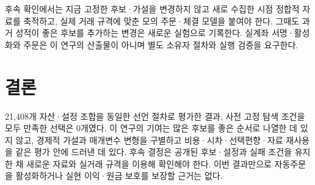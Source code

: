 \documentclass[11pt,a4paper]{article}
\begin{document}
후속 확인에서는 지금 고정한 후보·가설을 변경하지 않고 새로 수집한 시점 정합적 자료를 축적하고, 실제 거래 규격에 맞춘 모의 주문·체결 모델을 붙여야 한다. 그때도 과거 성적이 좋은 후보를 추가하는 변경은 새로운 실험으로 기록한다. 실계좌 서명·활성화와 주문은 이 연구의 산출물이 아니며 별도 소유자 절차와 실행 검증을 요구한다.

\section{결론}
21,408개 자산·설정 조합을 동일한 선언 절차로 평가한 결과, 사전 고정 탐색 조건을 모두 만족한 선택은 0개였다. 이 연구의 기여는 많은 후보를 좋은 순서로 나열한 데 있지 않고, 경제적 가설과 매개변수 변형을 구별하고 비용·시차·선택편향·자료 재사용을 같은 평가 안에 드러낸 데 있다. 후속 결정은 공개된 후보·설정과 실패 조건을 유지한 채 새로운 자료와 실거래 규격을 이용해 확인해야 한다. 이번 결과만으로 자동주문을 활성화하거나 실현 이익·원금 보호를 보장할 근거는 없다.

\appendix
\end{document}
